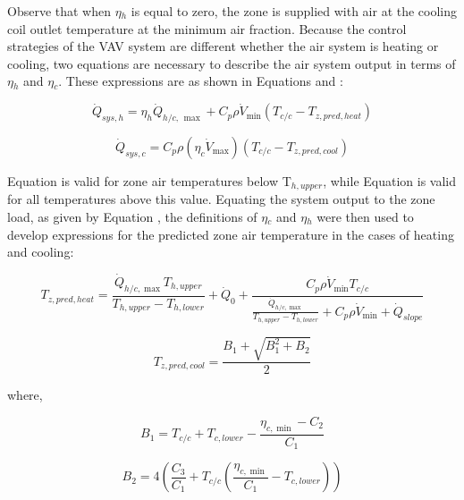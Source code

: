Observe that when $\eta$\(_{h}\) is equal to zero, the zone is supplied with air at the cooling coil outlet temperature at the minimum air fraction. Because the control strategies of the VAV system are different whether the air system is heating or cooling, two equations are necessary to describe the air system output in terms of $\eta$\(_{h}\) and $\eta$\(_{c}\). These expressions are as shown in Equations and :

\begin{equation}
{\dot Q_{sys,h}} = {\eta_h}{\dot Q_{h/c,\,\max }} + {C_p}\rho {\dot V_{\min }}\left( {{T_{c/c}} - {T_{z,pred,heat}}} \right)
\end{equation}

\begin{equation}
{\dot Q_{sys,c}} = {C_p}\rho \left( {{\eta_c}{{\dot V}_{\max }}} \right)\left( {{T_{c/c}} - {T_{z,pred,cool}}} \right)
\end{equation}

Equation is valid for zone air temperatures below T\(_{h,upper}\), while Equation is valid for all temperatures above this value. Equating the system output to the zone load, as given by Equation , the definitions of $\eta$\(_{c}\) and $\eta$\(_{h}\) were then used to develop expressions for the predicted zone air temperature in the cases of heating and cooling:

\begin{equation}
{T_{z,pred,heat}} = \frac{{{{\dot Q}_{h/c,\max }}{T_{h,upper}}}}{{{T_{h,upper}} - {T_{h,lower}}}} + {\dot Q_0} + \frac{{{C_p}\rho {{\dot V}_{\min }}{T_{c/c}}}}{{\frac{{{{\dot Q}_{h/c,\max }}}}{{{T_{h,upper}} - {T_{h,lower}}}} + {C_p}\rho {{\dot V}_{\min }} + {{\dot Q}_{slope}}}}
\end{equation}

\begin{equation}
{T_{z,pred,cool}} = \frac{{{B_1} + \sqrt {B_1^2 + {B_2}} }}{2}
\end{equation}

where,

\begin{equation}
{B_1} = {T_{c/c}} + {T_{c,lower}} - \frac{{{\eta_{c,\min }} - {C_2}}}{{{C_1}}}
\end{equation}

\begin{equation}
{B_2} = 4\left( {\frac{{{C_3}}}{{{C_1}}} + {T_{c/c}}\left( {\frac{{{\eta_{c,\min }}}}{{{C_1}}} - {T_{c,lower}}} \right)} \right)
\end{equation}

